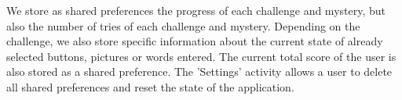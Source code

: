 \noindent
We store as shared preferences the progress of each challenge and mystery, but also the number of tries of each challenge and mystery. Depending on the challenge, we also store specific information about the current state of already selected buttons, pictures or words entered. The current total score of the user is also stored as a shared preference. The 'Settings' activity allows a user to delete all shared preferences and reset the state of the application.
